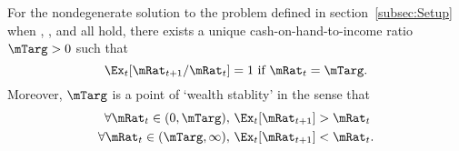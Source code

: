 \begin{theorem}\label{thm:target}
  For the nondegenerate solution to the problem defined in section~\ref{subsec:Setup} when {\FVAC}, {\WRIC}, and {\GICNrm} all hold, there exists a unique cash-on-hand-to-income ratio $\mTarg>0$ such that
  \begin{equation}
    \Ex_t [{\mRat}_{t+1}/\mRat_t] = 1 \mbox{~if~} \mRat_t = \mTarg.
    \label{eq:mTarget}
  \end{equation}
  Moreover, $\mTarg$ is a point of `wealth stablity' in the sense that
  \begin{align}\label{eq:stability}
    \forall {\mRat}_t\in(0,\mTarg),      \,\,& \Ex_t [{\mRat}_{t+1}] > {\mRat}_t  \\
    \forall {\mRat}_t\in(\mTarg,\infty), \,\,& \Ex_t [{\mRat}_{t+1}] < {\mRat}_t. \notag
  \end{align}
  \end{theorem}
